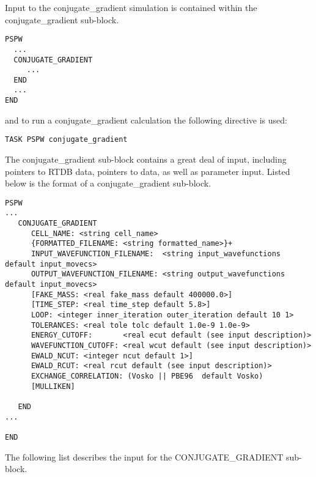 Input to the conjugate\_gradient simulation is contained
within the conjugate\_gradient sub-block.
\begin{verbatim}
PSPW
  ...
  CONJUGATE_GRADIENT
     ...
  END
  ...
END
\end{verbatim}
and to run a conjugate\_gradient calculation the following directive is used:
\begin{verbatim}
TASK PSPW conjugate_gradient 
\end{verbatim}
The conjugate\_gradient sub-block contains a great deal
of input, including pointers to RTDB data, pointers to data, as well as
parameter input.  Listed below is the format of a conjugate\_gradient sub-block.
\begin{verbatim}
PSPW
...
   CONJUGATE_GRADIENT
      CELL_NAME: <string cell_name>
      {FORMATTED_FILENAME: <string formatted_name>}+
      INPUT_WAVEFUNCTION_FILENAME:  <string input_wavefunctions  default input_movecs>
      OUTPUT_WAVEFUNCTION_FILENAME: <string output_wavefunctions default input_movecs>
      [FAKE_MASS: <real fake_mass default 400000.0>]
      [TIME_STEP: <real time_step default 5.8>]
      LOOP: <integer inner_iteration outer_iteration default 10 1>
      TOLERANCES: <real tole tolc default 1.0e-9 1.0e-9>
      ENERGY_CUTOFF:       <real ecut default (see input description)>
      WAVEFUNCTION_CUTOFF: <real wcut default (see input description)>
      EWALD_NCUT: <integer ncut default 1>]
      EWALD_RCUT: <real rcut default (see input description)>
      EXCHANGE_CORRELATION: (Vosko || PBE96  default Vosko)
      [MULLIKEN]

   END
...

END
\end{verbatim}
The following list describes the input for the CONJUGATE\_GRADIENT
sub-block.
